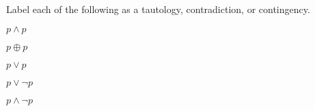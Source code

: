 
Label each of the following as a tautology, contradiction, or contingency.

$p \land p$

\vfill

$p \oplus p$

\vfill

$p \lor p$

\vfill

$p \lor \lnot p$

\vfill

$p \land \lnot p$

\vfill

